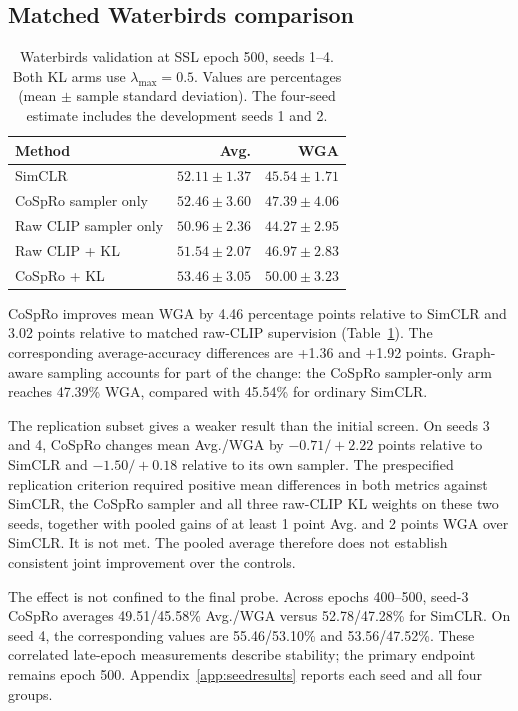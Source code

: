 \documentclass{article}
\begin{document}
\subsection{Matched Waterbirds comparison}
\begin{table}[htbp]
\centering
\caption{Waterbirds validation at SSL epoch 500, seeds 1--4. Both KL arms use
$\lambda_{\max}=0.5$. Values are percentages (mean $\pm$ sample standard
deviation). The four-seed estimate includes the development seeds 1 and 2.}
\begin{tabular}{lrr}
\toprule
Method & Avg. & WGA \\
\midrule
SimCLR & $52.11 \pm 1.37$ & $45.54 \pm 1.71$ \\
CoSpRo sampler only & $52.46 \pm 3.60$ & $47.39 \pm 4.06$ \\
Raw CLIP sampler only & $50.96 \pm 2.36$ & $44.27 \pm 2.95$ \\
Raw CLIP + KL & $51.54 \pm 2.07$ & $46.97 \pm 2.83$ \\
CoSpRo + KL & $53.46 \pm 3.05$ & $50.00 \pm 3.23$ \\
\bottomrule
\end{tabular}
\label{tab:main}
\end{table}

CoSpRo improves mean WGA by 4.46 percentage points relative to SimCLR and
3.02 points relative to matched raw-CLIP supervision (Table~\ref{tab:main}).
The corresponding average-accuracy differences are +1.36 and +1.92 points.
Graph-aware sampling accounts for part of the change: the CoSpRo sampler-only
arm reaches 47.39\% WGA, compared with 45.54\% for ordinary SimCLR.

The replication subset gives a weaker result than the initial screen.
On seeds 3 and 4, CoSpRo changes mean Avg./WGA by $-0.71/+2.22$ points
relative to SimCLR and $-1.50/+0.18$ relative to its own sampler.
The prespecified replication criterion required positive mean differences in
both metrics against SimCLR, the CoSpRo sampler and all three raw-CLIP KL
weights on these two seeds, together with pooled gains of at least 1 point
Avg. and 2 points WGA over SimCLR. It is not met. The pooled average therefore
does not establish consistent joint improvement over the controls.

The effect is not confined to the final probe. Across epochs 400--500,
seed-3 CoSpRo averages 49.51/45.58\% Avg./WGA versus 52.78/47.28\% for
SimCLR. On seed 4, the corresponding values are 55.46/53.10\% and
53.56/47.52\%. These correlated late-epoch measurements describe stability;
the primary endpoint remains epoch 500. Appendix~\ref{app:seedresults}
reports each seed and all four groups.
\end{document}
